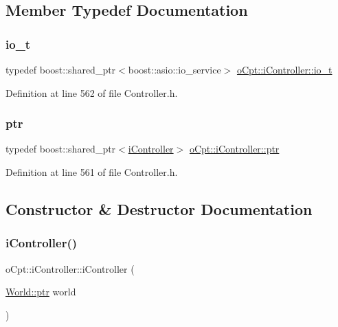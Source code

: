 \subsection{Member Typedef Documentation}
\hypertarget{classo_cpt_1_1i_controller_a51c3436b03060209f6cd2ddce6df2d0c}{}\label{classo_cpt_1_1i_controller_a51c3436b03060209f6cd2ddce6df2d0c} 
\subsubsection{\texorpdfstring{io\+\_\+t}{io\_t}}
{\footnotesize\ttfamily typedef boost\+::shared\+\_\+ptr$<$boost\+::asio\+::io\+\_\+service$>$ \hyperlink{classo_cpt_1_1i_controller_a51c3436b03060209f6cd2ddce6df2d0c}{o\+Cpt\+::i\+Controller\+::io\+\_\+t}}



Definition at line 562 of file Controller.\+h.

\hypertarget{classo_cpt_1_1i_controller_a6d89a95cd6ad68bb74adfaca2f36370f}{}\label{classo_cpt_1_1i_controller_a6d89a95cd6ad68bb74adfaca2f36370f} 
\subsubsection{\texorpdfstring{ptr}{ptr}}
{\footnotesize\ttfamily typedef boost\+::shared\+\_\+ptr$<$\hyperlink{classo_cpt_1_1i_controller}{i\+Controller}$>$ \hyperlink{classo_cpt_1_1i_controller_a6d89a95cd6ad68bb74adfaca2f36370f}{o\+Cpt\+::i\+Controller\+::ptr}}



Definition at line 561 of file Controller.\+h.



\subsection{Constructor \& Destructor Documentation}
\hypertarget{classo_cpt_1_1i_controller_acb46f6b610629978779f43e14b1c3f23}{}\label{classo_cpt_1_1i_controller_acb46f6b610629978779f43e14b1c3f23} 
\subsubsection{\texorpdfstring{i\+Controller()}{iController()}}
{\footnotesize\ttfamily o\+Cpt\+::i\+Controller\+::i\+Controller (\begin{DoxyParamCaption}\item[{\hyperlink{classo_cpt_1_1_world_aa6e591e3096d5de71e0cec9039663d67}{World\+::ptr}}]{world }\end{DoxyParamCaption})}

